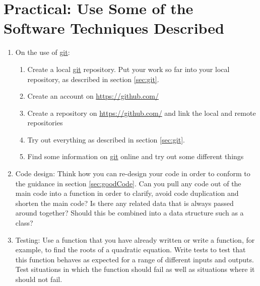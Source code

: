 \clearpage{}

\section{Practical: Use Some of the Software Techniques Described}
\begin{enumerate}
\item On the use of \url{git}:

\begin{enumerate}
\item Create a local \url{git} repository. Put your work so far into your
local repository, as described in section \ref{sec:git}.
\item Create an account on \url{https://github.com/} 
\item Create a repository on \url{https://github.com/} and link the local
and remote repositories
\item Try out everything as described in section \ref{sec:git}.
\item Find some information on \url{git} online and try out some different
things
\end{enumerate}
\item Code design: Think how you can re-design your code in order to conform
to the guidance in section \ref{sec:goodCode}. Can you pull any code
out of the main code into a function in order to clarify, avoid code
duplication and shorten the main code? Is there any related data that
is always passed around together? Should this be combined into a data
structure such as a class?
\item Testing: Use a function that you have already written or write a function,
for example, to find the roots of a quadratic equation. Write tests
to test that this function behaves as expected for a range of different
inputs and outputs. Test situations in which the function should fail
as well as situations where it should not fail.
\end{enumerate}

